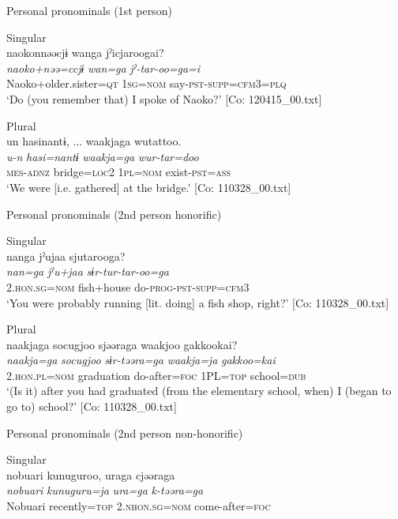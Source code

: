 \begin{table}
\ea\label{ex:6-117}
  Personal pronominals (1st person)

 \ea Singular\\
{\TM}
\glll  naokonnəəcjɨ  wanga  jˀicjaroogai?\\
\textit{naoko+nəə=ccjɨ}  \textit{wan=ga}  \textit{jˀ-tar-oo=ga=i}\\
Naoko+older.sister=\textsc{qt}  1\textsc{sg}=\textsc{nom}  say-\textsc{pst}-\textsc{supp}=\textsc{cfm}3=\textsc{plq}\\
\glt ‘Do (you remember that) I spoke of Naoko?’ [Co: 120415\_00.txt]
\z

\ex Plural\\
{\TM}
\glll  un  hasinantɨ, ...  waakjaga  wutattoo.\\
\textit{u-n}  \textit{hasi=nantɨ}  \textit{waakja=ga}  \textit{wur-tar=doo}\\
\textsc{mes}-\textsc{adnz}  bridge=\textsc{loc}2  1\textsc{pl}=\textsc{nom}  exist-\textsc{pst}=\textsc{ass}\\
\glt ‘We were [i.e. gathered] at the bridge.’ [Co: 110328\_00.txt]
\z

  Personal pronominals (2nd person honorific)

\ex Singular\\
{\TM}
\glll  nanga  jˀujaa  sjutarooga?\\
\textit{nan=ga}  \textit{jˀu+jaa}  \textit{sɨr-tur-tar-oo=ga}\\
2.\textsc{hon}.\textsc{sg}=\textsc{nom}  fish+house  do-\textsc{prog}-\textsc{pst}-\textsc{supp}=\textsc{cfm}3\\
\glt ‘You were probably running [lit. doing] a fish shop, right?’ [Co: 110328\_00.txt]
\z

\ex Plural\\
{\TM}
\glll  naakjaga  {\textbar}socugjoo{\textbar}  sjəəraga  waakjoo  {\textbar}gakkoo{\textbar}kai?\\
\textit{naakja=ga}  \textit{socugjoo}  \textit{sɨr-təəra=ga}  \textit{waakja=ja}  \textit{gakkoo=kai}\\
2.\textsc{hon}.\textsc{pl}=\textsc{nom}  graduation  do-after=\textsc{foc}  1PL=\textsc{top}  school=\textsc{dub}\\
\glt ‘(Is it) after you had graduated (from the elementary school, when) I (began to go to) school?’ [Co: 110328\_00.txt]
\z

  Personal pronominals (2nd person non-honorific)

\ex Singular\\
{\TM}
\glll  nobuari  kunuguroo,  uraga  cjəəraga\\
\textit{nobuari}  \textit{kunuguru=ja}  \textit{ura=ga}  \textit{k-təəra=ga}\\
Nobuari  recently=\textsc{top}  2.\textsc{nhon}.\textsc{sg}=\textsc{nom}  come-after=\textsc{foc}


\end{table}

